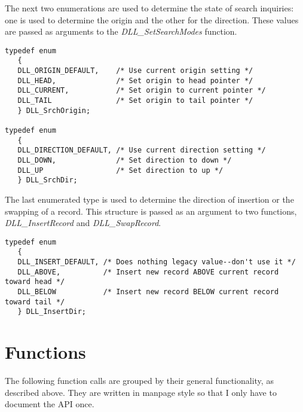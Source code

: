 \documentclass[10pt,letterpaper,titlepage]{article}
\begin{document}
\noindent
The next two enumerations are used to determine the state of search inquiries: one is used to determine the origin and the other for the direction.  These values are passed as arguments to the \emph{DLL\_SetSearchModes} function.

\small
\begin{verbatim}
typedef enum
   {
   DLL_ORIGIN_DEFAULT,    /* Use current origin setting */
   DLL_HEAD,              /* Set origin to head pointer */
   DLL_CURRENT,           /* Set origin to current pointer */
   DLL_TAIL               /* Set origin to tail pointer */
   } DLL_SrchOrigin;

typedef enum
   {
   DLL_DIRECTION_DEFAULT, /* Use current direction setting */
   DLL_DOWN,              /* Set direction to down */
   DLL_UP                 /* Set direction to up */
   } DLL_SrchDir;
\end{verbatim}
\normalsize
\vspace{8pt}

\noindent
The last enumerated type is used to determine the direction of insertion or the swapping of a record.  This structure is passed as an argument to two functions, \emph{DLL\_InsertRecord} and \emph{DLL\_SwapRecord}.

\small
\begin{verbatim}
typedef enum
   {
   DLL_INSERT_DEFAULT, /* Does nothing legacy value--don't use it */
   DLL_ABOVE,          /* Insert new record ABOVE current record toward head */
   DLL_BELOW           /* Insert new record BELOW current record toward tail */
   } DLL_InsertDir;
\end{verbatim}
\normalsize
\newpage

\section{Functions}
The following function calls are grouped by their general functionality, as described above.  They are written in manpage style so that I only have to document the API once.
\end{document}
